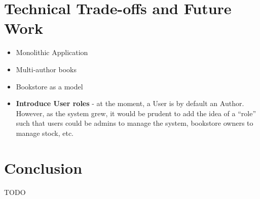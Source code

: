 \documentclass[a4paper]{article}
\begin{document}
\section{Technical Trade-offs and Future Work}

\begin{itemize}
  \item Monolithic Application
  \item Multi-author books
  \item Bookstore as a model
  \item \textbf{Introduce User roles} - at the moment, a User is by default an Author. However, as
  the system grew, it would be prudent to add the idea of a ``role'' such that
  users could be admins to manage the system, bookstore owners to manage stock,
  etc.
\end{itemize}

\section{Conclusion}

TODO
\end{document}
